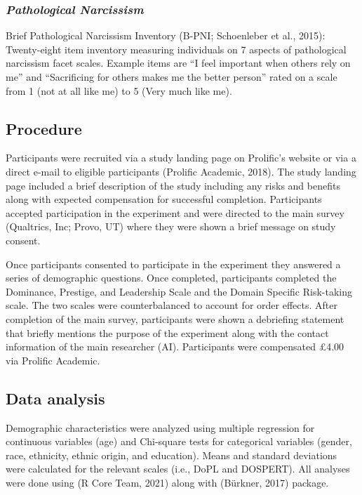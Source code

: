 \documentclass[
  donotrepeattitle,doc, 12pt, a4paper,floatsintext]{apa7}
\begin{document}
\hypertarget{pathological-narcissism}{%
\subsubsection{\texorpdfstring{\emph{Pathological Narcissism}}{Pathological Narcissism}}\label{pathological-narcissism}}

Brief Pathological Narcissism Inventory (B-PNI; Schoenleber et al., 2015): Twenty-eight item inventory measuring individuals on 7 aspects of pathological narcissism facet scales. Example items are ``I feel important when others rely on me'' and ``Sacrificing for others makes me the better person'' rated on a scale from 1 (not at all like me) to 5 (Very much like me).

\hypertarget{procedure-4}{%
\subsection{Procedure}\label{procedure-4}}

Participants were recruited via a study landing page on Prolific's website or via a direct e-mail to eligible participants (Prolific Academic, 2018). The study landing page included a brief description of the study including any risks and benefits along with expected compensation for successful completion. Participants accepted participation in the experiment and were directed to the main survey (Qualtrics, Inc; Provo, UT) where they were shown a brief message on study consent.

Once participants consented to participate in the experiment they answered a series of demographic questions. Once completed, participants completed the Dominance, Prestige, and Leadership Scale and the Domain Specific Risk-taking scale. The two scales were counterbalanced to account for order effects. After completion of the main survey, participants were shown a debriefing statement that briefly mentions the purpose of the experiment along with the contact information of the main researcher (AI). Participants were compensated £4.00 via Prolific Academic.

\hypertarget{data-analysis-4}{%
\subsection{Data analysis}\label{data-analysis-4}}

Demographic characteristics were analyzed using multiple regression for continuous variables (age) and Chi-square tests for categorical variables (gender, race, ethnicity, ethnic origin, and education). Means and standard deviations were calculated for the relevant scales (i.e., DoPL and DOSPERT). All analyses were done using (R Core Team, 2021) along with (Bürkner, 2017) package.
\end{document}
